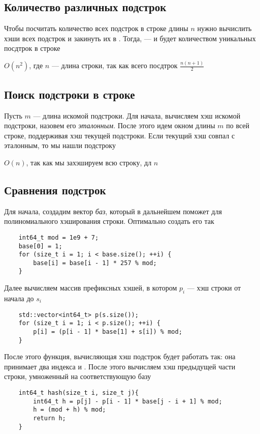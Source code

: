 \documentclass[a4paper]{article}
\begin{document}



\subsection{Количество различных подстрок}   
Чтобы посчитать количество всех подстрок в строке длины $n$ нужно вычислить хэши всех подстрок и закинуть их в . Тогда,  — и будет количеством уникальных посдтрок в строке

\difficulty $O(n^2)$, где $n$ — длина строки, так как всего посдтрок $\displaystyle\frac{n(n+1)}{2}$

\subsection{Поиск подстроки в строке}

Пусть $m$ — длина искомой подстроки. Для начала, вычисляем хэш искомой подстроки, назовем его \textit{эталонным}. После этого идем окном длины $m$ по всей строке, поддерживая хэш текущей подстроки. Если текущий хэш совпал с эталонным, то мы нашли подстроку

\difficulty $O(n)$, так как мы захэшируем всю строку, дл $n$
\subsection{Сравнения подстрок}
Для начала, создадим вектор \textit{баз}, который в дальнейшем поможет для полиномиального хэширования строки. Оптимально создать его так
\begin{lstlisting}
    int64_t mod = 1e9 + 7;
    base[0] = 1;
    for (size_t i = 1; i < base.size(); ++i) {
        base[i] = base[i - 1] * 257 % mod;
    }
\end{lstlisting}
Далее вычисляем массив префиксных хэшей, в котором $p_i$ — хэш строки от начала до $s_i$
\begin{lstlisting}
    std::vector<int64_t> p(s.size());
    for (size_t i = 1; i < p.size(); ++i) {
        p[i] = (p[i - 1] * base[1] + s[i]) % mod;
    }
\end{lstlisting}
После этого функция, вычисляющая хэш подстрок будет работать так: она принимает два индекса  и . После этого вычисляем хэш предыдущей части строки, умноженный на соответствующую базу
\begin{lstlisting}
    int64_t hash(size_t i, size_t j){
        int64_t h = p[j] - p[i - 1] * base[j - i + 1] % mod;
        h = (mod + h) % mod;
        return h;
    }
\end{lstlisting}
\end{document}
